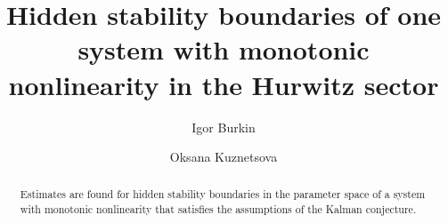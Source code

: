 
\begin{englishtitle} %
\title{Hidden stability boundaries of one system with monotonic nonlinearity in the Hurwitz sector}
\author{Igor Burkin  \and  Oksana Kuznetsova
}

\maketitle

\begin{abstract}
Estimates are found for hidden stability boundaries in the parameter space of a system with monotonic nonlinearity that satisfies the assumptions of the Kalman conjecture. 

\end{abstract}
\end{englishtitle}


%


